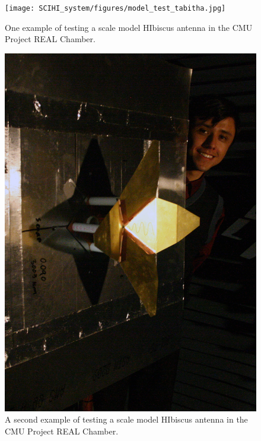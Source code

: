 \begin{figure}[htb]
\centering
\begin{minipage}[b]{0.48\textwidth}
\centering
\texttt{[image: SCIHI\_system/figures/model\_test\_tabitha.jpg]}
\caption{One example of testing a scale model HIbiscus antenna in the CMU Project REAL Chamber. }
\label{Fig:hibiscus_scale_tabitha}
\end{minipage}%
\begin{minipage}[b]{0.02\textwidth}
\hspace{1cm}
\end{minipage}%
\begin{minipage}[b]{0.46\textwidth}
\centering
\includegraphics[width=0.95\linewidth]{SCIHI_system/figures/model_test_jose.jpg}
\caption{A second example of testing a scale model HIbiscus antenna in the CMU Project REAL Chamber.} 
\label{Fig:hibiscus_scale_jose}
\end{minipage}
\end{figure}
 
